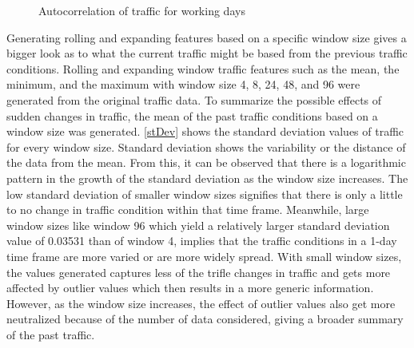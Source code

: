 \begin{figure}[h] 
\centering
  \centering
  \caption{Autocorrelation of traffic for working days}
  \label{autocorr_whyRE}
\end{figure}


Generating rolling and expanding features based on a specific window size gives a bigger look as to what the current traffic might be based from the previous traffic conditions. Rolling and expanding window traffic features such as the mean, the minimum, and the maximum with window size  4, 8, 24, 48, and 96 were generated from the original traffic data. To summarize the possible effects of sudden changes in traffic, the mean of the past traffic conditions based on a window size was generated.  \ref{stDev} shows the standard deviation values of traffic for every window size. Standard deviation shows the variability or the distance of the data from the mean. From this, it can be observed that there is a logarithmic pattern in the growth of the standard deviation as the window size increases. The low standard deviation of smaller window sizes signifies that there is only a little to no change in traffic condition within that time frame. Meanwhile, large window sizes like window 96 which yield a relatively larger standard deviation value of 0.03531 than of window 4, implies that the traffic conditions in a 1-day time frame are more varied or are more widely spread. With small window sizes, the values generated captures less of the trifle changes in traffic and gets more affected by outlier values which then results in a more generic information. However, as the window size increases, the effect of outlier values also get more neutralized because of the number of data considered, giving a broader summary of the past traffic. 

